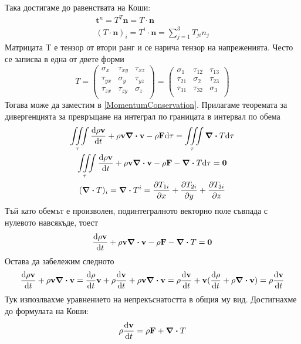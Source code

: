Така достигаме до равенствата на Коши:
\begin{gather}
	\mathbf{t}^{n} = T^T \mathbf{n} = T \cdot \mathbf{n} \\
	(T \cdot \mathbf{n})_i = T^i \cdot \mathbf{n} = \sum\limits_{j=1}^3 T_{ji} n_j 
\end{gather}
Матрицата T е тензор от втори ранг и се нарича тензор на напреженията. 
Често се записва в една от двете форми
\begin{equation}
	T = 
		\begin{pmatrix}
			\sigma_x & \tau_{xy} & \tau_{xz} \\
			\tau_{yx} & \sigma_y & \tau_{yz} \\
			\tau_{zx} & \tau_{zy} & \sigma_z \\
		\end{pmatrix} =
		\begin{pmatrix}
			\sigma_1 & \tau_{12} & \tau_{13} \\
			\tau_{21} & \sigma_2 & \tau_{23} \\
			\tau_{31} & \tau_{32} & \sigma_3 \\
		\end{pmatrix}
\end{equation}
Тогава може да заместим в \eqref{MomentumConservation}.
Прилагаме теоремата за дивергенцията за превръщане на интеграл по границата в интервал по обема
\begin{gather}
	\iiint\limits_{\tau} \dv{\rho \mathbf{v}}{t} + \rho \mathbf{v} \div \mathbf{v} - \rho \mathbf{F} \dd \tau = \iiint\limits_{\tau} \div T \dd \tau \\
	\nonumber \iiint\limits_{\tau} \dv{\rho \mathbf{v}}{t} + \rho \mathbf{v} \div \mathbf{v} - \rho \mathbf{F} - \div T \dd \tau = \mathbf{0} \\
	\nonumber (\div T)_i = \div T^i = \pdv{T_{1i}}{x} + \pdv{T_{2i}}{y} + \pdv{T_{3i}}{z}  
\end{gather}
Тъй като обемът е произволен, подинтегралното векторно поле съвпада с нулевото навсякъде, тоест
\begin{equation}
	\dv{\rho \mathbf{v}}{t} + \rho \mathbf{v} \div \mathbf{v} - \rho \mathbf{F} - \div T = \mathbf{0}
\end{equation}
Остава да забележим следното
\begin{equation}
	\dv{\rho \mathbf{v}}{t} + \rho \mathbf{v} \div \mathbf{v} = \dv{\rho}{t} \mathbf{v} + \rho \dv{\mathbf{v}}{t} + \rho \mathbf{v} \div \mathbf{v} = \rho \dv{\mathbf{v}}{t} + \mathbf{v}(\dv{\rho}{t} + \rho \div \mathbf{v}) = \rho \dv{\mathbf{v}}{t}
\end{equation}
Тук изпозлвахме уравнението на непрекъснатостта в общия му вид. Достигнахме до формулата на Коши:
\begin{equation}
	\rho \dv{\mathbf{v}}{t} = \rho \mathbf{F} + \div T
\end{equation}
